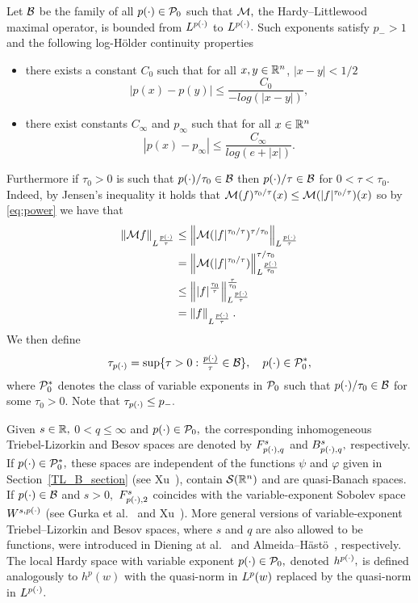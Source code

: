 Let $\B$ be the family of all $\pp \in \P_0$ such that $\M,$  the Hardy--Littlewood maximal operator, is bounded from $\Lp$ to $\Lp.$ Such exponents satisfy $p_- > 1$ and the following log-H\"older continuity properties
\begin{itemize}
\item there exists a constant $C_0$ such that for all $x,y\in \rn$, $|x-y|<1/2$
\[ |p(x)-p(y)| \leq \frac{C_0}{-log(|x-y|)}, \]
\item there exist constants $C_\infty$ and $p_\infty$ such that for all $x\in\rn$ 
\[|p(x) - p_\infty| \leq \frac{C_\infty}{log(e + |x|)}.	 \]
\end{itemize}
Furthermore if 
$\tau_0 >0$ 
is such that 
$p(\cdot)/\tau_0 \in \B$ 
then $\pp/\tau \in \B$ for $0<\tau<\tau_0$. 
Indeed, by Jensen's inequality it holds that 
$\M(f)^{\tau_0/\tau}(x) 
\leq \M(|f|^{\tau_0/\tau})(x)$ 
so by \ref{eq:power} we have that 
\begin{align*}
\norm{\M f}{L^{\frac{p(\cdot)}{\tau}}} &\leq \norm{\M(|f|^{\tau_0/\tau})^{\tau/\tau_0}}{L^{\frac{p(\cdot)}{\tau}}} \\
& = \norm{\M(|f|^{\tau_0/\tau})}{L^{\frac{\pp}{\tau_0} }}^{\tau/\tau_0}\\
& \leq \norm{|f|^{\frac{\tau_0}{\tau}}}{L^{\frac{p(\cdot)}{\tau}}}^{\frac{\tau}{\tau_0}} \\
& = \norm{f}{L^{\frac{p(\cdot)}{\tau}}}.
\end{align*}
We then define
\begin{equation*}
\tau_{\pp}=\sup\{\tau>0:\fr{\pp}{\tau}\in \B\},\quad \pp\in \P_0^*,
\end{equation*}
where $\P_0^*$ denotes the class of variable exponents in $\P_0$ such that $\pp/\tau_0\in\B$ for some $\tau_0>0.$ Note that $\tau_{\pp}\le p_-.$


Given $s\in\re,$ $0<q\le \infty$ and $\pp\in\P_0,$ the corresponding inhomogeneous Triebel-Lizorkin and Besov spaces are denoted by $\itl{\pp}{s}{q}$  and  $\ibes{\pp}{s}{q},$
respectively. If $\pp\in\P_0^*,$ these spaces are independent of the functions $\psi$ and $\varphi$ given in  Section~\ref{TL_B_section} (see  Xu~\cite{MR2431378}), contain $\sw$ and are quasi-Banach spaces. If $\pp\in\B$ and $s>0,$ $\itl{\pp}{s}{2}$ coincides with the variable-exponent  Sobolev space $W^{s,\pp}$ (see Gurka et al.~\cite{MR2339558} and Xu~\cite{MR2449626}). More general versions of variable-exponent  Triebel--Lizorkin and Besov spaces, where $s$ and  $q$ are also allowed to be functions, were introduced in  Diening at al.~\cite{MR2498558} and Almeida--H\"ast\"o~\cite{MR2566313}, respectively. 
The local Hardy space with variable exponent $\pp\in \P_0,$  denoted $h^{\pp},$  is defined analogously to $h^p(w)$ with the quasi-norm in $\lebw{p}{w}$ replaced by the quasi-norm in $\Lp.$ 

